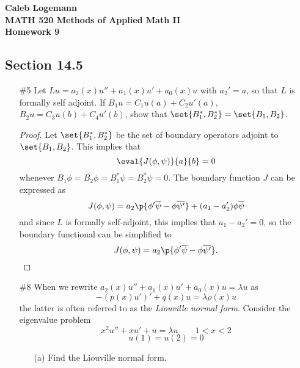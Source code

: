 \documentclass[11pt, oneside]{article}
\begin{document}
\noindent \textbf{\Large{Caleb Logemann \\
MATH 520 Methods of Applied Math II \\
Homework 9
}}

\subsection*{Section 14.5}
\begin{enumerate}
  \item[\#5]
    Let $Lu = a_2(x) u'' + a_1(x)u' + a_0(x) u$ with $a_2' = a$, so that $L$ is
    formally self adjoint.
    If $B_1 u = C_1 u(a) + C_2u'(a)$, $B_2 u = C_3u(b) + C_4u'(b)$, show that
    $\set{B_1^*, B_2^*} = \set{B_1, B_2}$.

    \begin{proof}
      Let $\set{B_1^*, B_2^*}$ be the set of boundary operators adjoint to
      $\set{B_1, B_2}$.
      This implies that
      \[
        \eval{J(\phi, \psi)}{a}{b} = 0
      \]
      whenever $B_1 \phi = B_2 \phi = B_1^* \psi = B_2^* \psi = 0$.
      The boundary function $J$ can be expressed as
      \[
        J(\phi, \psi) = a_2\p{\phi' \overline{\psi} - \phi \overline{\psi'}} + (a_1 - a_2') \phi \overline{\psi}
      \]
      and since $L$ is formally self-adjoint, this implies that $a_1 - a_2' = 0$,
      so the boundary functional can be simplified to
      \[
        J(\phi, \psi) = a_2\p{\phi' \overline{\psi} - \phi \overline{\psi'}}.
      \]
    \end{proof}

  \pagebreak
  \item[\#8]
    When we rewrite $a_2(x) u'' + a_1(x) u' + a_0(x) u = \lambda u$ as
    \[
      -(p(x)u')' + q(x)u = \lambda \rho(x) u
    \]
    the latter is often referred to as the \textit{Liouville normal form}.
    Consider the eigenvalue problem
    \[
      x^2 u'' + xu' + u = \lambda u \qquad 1 < x < 2
    \]
    \[
      u(1) = u(2) = 0
    \]
    \begin{enumerate}
      \item[(a)]
        Find the Liouville normal form.


\end{enumerate}
\end{enumerate}
\end{document}
